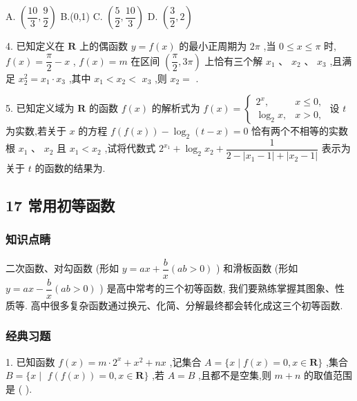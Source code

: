 A. $\left( {\dfrac{10}{3},\dfrac{9}{2}}\right)$ B.(0,1) C. $\left( {\dfrac{5}{2},\dfrac{10}{3}}\right)$ D. $\left( {\dfrac{3}{2},2}\right)$

4. 已知定义在 $\mathbf{R}$ 上的偶函数 $y = f\left( x\right)$ 的最小正周期为 ${2\pi }$ ,当 $0 \leq  x \leq  \pi$ 时, $f\left( x\right)  = \dfrac{\pi }{2} - x$ , $f\left( x\right)  = m$ 在区间 $\left( {\dfrac{\pi }{2},{3\pi }}\right)$ 上恰有三个解 ${x}_{1}\text{ 、 }{x}_{2}\text{ 、 }{x}_{3}$ ,且满足 ${x}_{2}^{2} = {x}_{1} \cdot  {x}_{3}$ ,其中 ${x}_{1} < {x}_{2} <$  ${x}_{3}$ ,则 ${x}_{2} =$ \blkda{}.

5. 已知定义域为 $\mathbf{R}$ 的函数 $f\left( x\right)$ 的解析式为 $f\left( x\right)  = \left\{  \begin{array}{ll} {2}^{x}, & x \leq  0, \\  {\log }_{2}x, & x > 0, \end{array}\right.$ 设 $t$ 为实数,若关于 $x$ 的方程 $f\left( {f\left( x\right) }\right)  - {\log }_{2}\left( {t - x}\right)  = 0$ 恰有两个不相等的实数根 ${x}_{1}\text{ 、 }{x}_{2}$ 且 ${x}_{1} < {x}_{2}$ ,试将代数式 ${2}^{{x}_{1}} + {\log }_{2}{x}_{2} + \dfrac{1}{2 - \left| {{x}_{1} - 1}\right|  + \left| {{x}_{2} - 1}\right| }$ 表示为关于 $t$ 的函数的结果为\blkda{}.

\subsection*{17 常用初等函数}

\subsubsection*{知识点睛}

二次函数、对勾函数 (形如 $y = {ax} + \dfrac{b}{x}\left( {{ab} > 0}\right)$ ) 和滑板函数 (形如 $y = {ax} - \dfrac{b}{x}\left( {{ab} > 0}\right)$ ) 是高中常考的三个初等函数, 我们要熟练掌握其图象、性质等. 高中很多复杂函数通过换元、化简、分解最终都会转化成这三个初等函数.

\subsubsection*{经典习题}

1. 已知函数 $f\left( x\right)  = m \cdot  {2}^{x} + {x}^{2} + {nx}$ ,记集合 $A = \{ x \mid  f\left( x\right)  = 0,x \in  \mathbf{R}\}$ ,集合 $B = \{ x \mid$  $f\left( {f\left( x\right) }\right)  = 0,x \in  \mathbf{R}\}$ ,若 $A = B$ ,且都不是空集,则 $m + n$ 的取值范围是 (   ).

